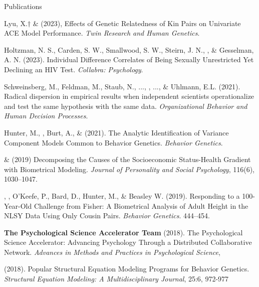 \begin{rSection}{\textrm{Publications}}
\begin{etaremune}
\item Lyu, X.$\dagger$ \& \meb (2023), Effects of Genetic Relatedness of Kin Pairs on Univariate ACE Model Performance. \textit{Twin Research and Human Genetics}. 

\item Holtzman, N. S., Carden, S. W., Smallwood, S. W., Steirn, J. N., \meb, \& Gesselman, A. N. (2023). Individual Difference Correlates of Being Sexually Unrestricted Yet Declining an HIV Test. \textit{Collabra: Psychology}. 
%
\item Schweinsberg, M., Feldman, M., Staub, N., ..., \meb, ..., \& Uhlmann, E.L. (2021). Radical dispersion in empirical results when independent scientists operationalize and test the same hypothesis with the same data. \textit{Organizational Behavior and Human Decision Processes}. 
%
\item Hunter, M., \meb, Burt, A., \& \joe (2021). The Analytic Identification of Variance Component Models Common to Behavior Genetics. \textit{Behavior Genetics}. 
%
\item \meb \& \joe (2019) Decomposing the Causes of the Socioeconomic Status-Health Gradient with Biometrical Modeling. \textit{Journal of Personality and Social Psychology}, 116(6), 1030–1047.  %
%
\item\Joe, \meb, O'Keefe, P., Bard, D., Hunter, M., \& Beasley W. (2019). Responding to a 100-Year-Old Challenge from Fisher: A Biometrical Analysis of Adult Height in the NLSY Data Using Only Cousin Pairs. \textit{Behavior Genetics}. 444–454. 
%
\item \textbf{The Psychological Science Accelerator Team} (2018). The Psychological Science Accelerator: Advancing Psychology Through a Distributed Collaborative Network. \textit{Advances in Methods and Practices in Psychological Science}, 
%
\item \meb (2018). Popular Structural Equation Modeling Programs for Behavior Genetics. \textit{Structural Equation Modeling: A Multidisciplinary Journal}, 25:6, 972-977 

\end{etaremune}
\end{rSection}
